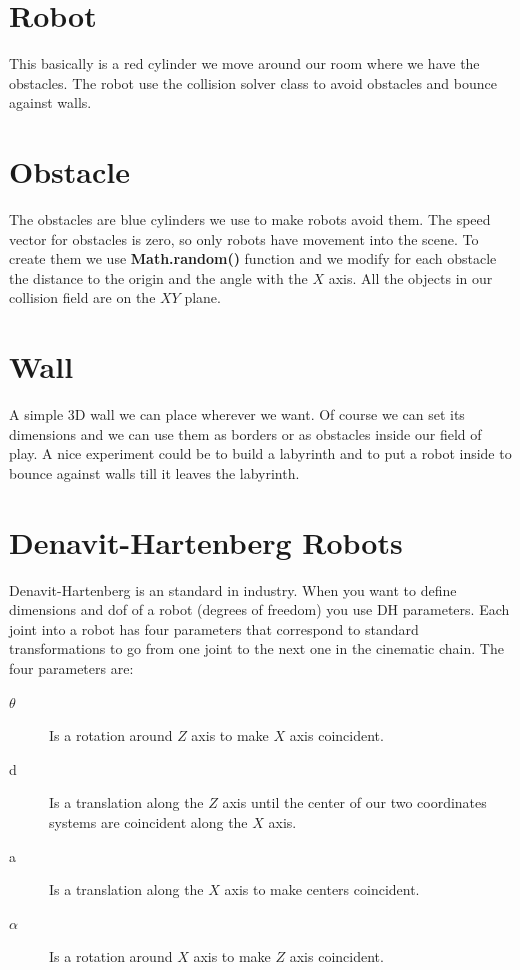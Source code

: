 \documentclass[12pt,a4paper,oneside,english]{book}
\begin{document}
\begin{verbatim}
\end{verbatim}

\section{Robot}

This basically is a red cylinder we move around our room where we have the obstacles. The robot use the collision solver class to avoid obstacles and bounce against walls.

\section{Obstacle}

The obstacles are blue cylinders we use to make robots avoid them. The speed vector for obstacles is zero, so only robots have movement into the scene. To create them we use \textbf{Math.random()} function and we modify for each obstacle the distance to the origin and the angle with the $X$ axis. All the objects in our collision field are on the $XY$ plane.

\section{Wall}

A simple 3D wall we can place wherever we want. Of course we can set its dimensions and we can use them as borders or as obstacles inside our field of play. A nice experiment could be to build a labyrinth and to put a robot inside to bounce against walls till it leaves the labyrinth.

\section{Denavit-Hartenberg Robots}

Denavit-Hartenberg is an standard in industry. When you want to define dimensions and dof of a robot (degrees of freedom) you use DH parameters. Each joint into a robot has four parameters that correspond to standard transformations to go from one joint to the next one in the cinematic chain. The four parameters are:

\begin{description}
  \item[$\theta$ ] Is a rotation around $Z$ axis to make $X$ axis coincident.
  \item[d ] Is a translation along the $Z$ axis until the center of our two coordinates systems are coincident along the $X$ axis.
  \item[a ] Is a translation along the $X$ axis to make centers coincident.
  \item[$\alpha$ ] Is a rotation around $X$ axis to make $Z$ axis coincident.
\end{description}
\end{document}
